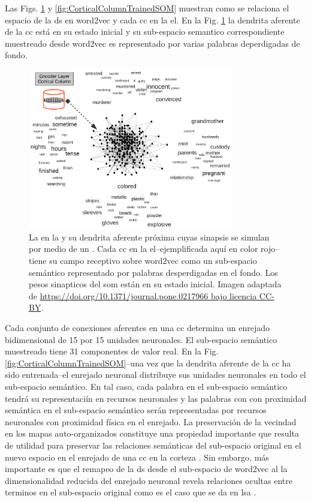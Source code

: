 {Las Figs. \ref{fig:CorticalColumnSOM} y \ref{fig:CorticalColumnTrainedSOM} muestran como se relaciona el espacio de la \gls{ds} en word2vec y cada \gls{cc} en la \gls{el}.
En la Fig. \ref{fig:CorticalColumnSOM} la dendrita aferente de la \gls{cc} está en su estado inicial y su sub-espacio semantico correspondiente muestreado desde word2vec es representado por varias palabras deperdigadas de fondo.
 
\begin{figure}[ht!]
    \centering
    \includegraphics[width=0.8\textwidth]{CorticalColumnSOM.png}
    \caption{La  en la  y su dendrita aferente próxima cuyas sinapsis se simulan  por medio de un . Cada \gls{cc} en la \gls{el}--ejemplificada aquí en color rojo--tiene su campo receptivo sobre word2vec como un sub-espacio semántico representado por palabras desperdigadas en el fondo. Los pesos sinapticos del \gls{som} están en su estado inicial. Imagen adaptada de \url{https://doi.org/10.1371/journal.pone.0217966 bajo licencia CC-BY}.}
    \label{fig:CorticalColumnSOM}
\end{figure}

Cada conjunto de conexiones aferentes en una \gls{cc} determina un enrejado bidimensional de 15 por 15 unidades neuronales.
El sub-espacio semántico muestreado tiene 31 componentes de valor real.
En la Fig. \ref{fig:CorticalColumnTrainedSOM}--una vez que la dendrita aferente de la \gls{cc} ha sido entrenada--el enrejado neuronal distribuye sus unidades neuronales en todo el sub-espacio semántico. En tal caso, cada palabra en el sub-espacio semántico tendrá su representaciín en recursos neuronales y las palabras con con proximidad semántica en el sub-espacio semántico serán representadas por recursos neuronales con proximidad física en el enrejado. La preservación de la vecindad en los mapas auto-organizados constituye una propiedad importante que resulta de utilidad para preservar las relaciones semánticas del sub-espacio original en el nuevo espacio en el enrejado de una \gls{cc} en la corteza \cite{557663}. Sin embargo, más importante es que el remapeo de la \gls{ds} desde el sub-espacio de word2vec al la dimensionalidad reducida del enrejado neuronal revela relaciones ocultas entre terminos en el sub-espacio original como es el caso que se da en \gls{lsa} \cite{key:article}.

}
